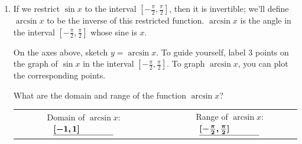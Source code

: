 \documentclass[main]{subfiles}
\begin{document}
\begin{enumerate}
\begin{enumerate}
  \item


    \begin{problem}
      If we restrict $\sin x$ to the interval $ \left[ -
        \frac{\pi}{2}, \frac{\pi}{2} \right]$, then it is invertible;
      we'll define $\arcsin x$ to be the inverse of this restricted
      function. $\arcsin x$ is the angle in the interval $[-\frac{\pi}{2},
      \frac{\pi}{2}]$ whose sine is $x$.
      
      On the axes above, sketch $y = \arcsin x$.  To guide
      yourself, label 3 points on the graph of
      $\sin x$ in the interval $[-\frac{\pi}{2},\frac{\pi}{2}]$. To graph
      $\arcsin x$, you can plot the corresponding points.
      
      What are the domain and range of the function $\arcsin x$?
      \begin{center}
      \begin{tabular}{ccc}
        Domain of $\arcsin x$: $\fitb{1in}{[-1,1]}$
        &&
        Range of $\arcsin x$: $\fitb{1in}{[-\frac{\pi}{2},\frac{\pi}{2}]}$
      \end{tabular}
      \end{center}
    \end{problem}


\end{enumerate}
\end{enumerate}
\end{document}
